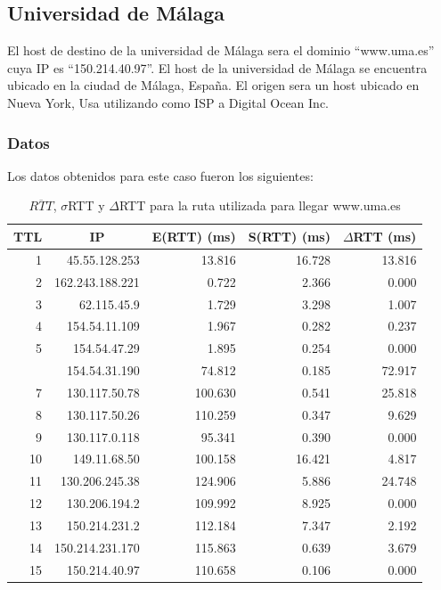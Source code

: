 \subsection{Universidad de M\'alaga}
El host de destino de la universidad de Málaga sera el dominio ``www.uma.es'' cuya IP es ``150.214.40.97''. El host de la universidad de M\'alaga se encuentra ubicado en la ciudad de M\'alaga, España. El origen sera un host ubicado en Nueva York, Usa utilizando como ISP a Digital Ocean Inc.


\subsubsection{Datos}

Los datos obtenidos para este caso fueron los siguientes:

\begin{table}[H]
    \begin{center}
        \begin{tabular}{| r | r | r | r | r |}
  \hline
  {\bf TTL} & \multicolumn{1}{|c|}{\bf IP} & {\bf E(RTT) (ms)} & {\bf S(RTT) (ms)} & {\bf $\Delta$RTT (ms)}\\
  \hline
\hline 1 & 45.55.128.253 & 13.816 & 16.728 & 13.816\\
\hline 2 & 162.243.188.221 & 0.722 & 2.366 & 0.000\\
\hline 3 & 62.115.45.9 & 1.729 & 3.298 & 1.007\\
\hline 4 & 154.54.11.109 & 1.967 & 0.282 & 0.237\\
\hline 5 & 154.54.47.29 & 1.895 & 0.254 & 0.000\\
\rowcolor{blue!25}\hline 6 & 154.54.31.190 & 74.812 & 0.185 & 72.917\\
\hline 7 & 130.117.50.78 & 100.630 & 0.541 & 25.818\\
\hline 8 & 130.117.50.26 & 110.259 & 0.347 & 9.629\\
\hline 9 & 130.117.0.118 & 95.341 & 0.390 & 0.000\\
\hline 10 & 149.11.68.50 & 100.158 & 16.421 & 4.817\\
\hline 11 & 130.206.245.38 & 124.906 & 5.886 & 24.748\\
\hline 12 & 130.206.194.2 & 109.992 & 8.925 & 0.000\\
\hline 13 & 150.214.231.2 & 112.184 & 7.347 & 2.192\\
\hline 14 & 150.214.231.170 & 115.863 & 0.639 & 3.679\\
\hline 15 & 150.214.40.97 & 110.658 & 0.106 & 0.000\\
\hline
        \end{tabular}
        \caption{$\overline{RTT}$, $\sigma$RTT y $\Delta$RTT para la ruta utilizada para llegar www.uma.es}
        \label{table:malaga} 
    \end{center}
\end{table}

